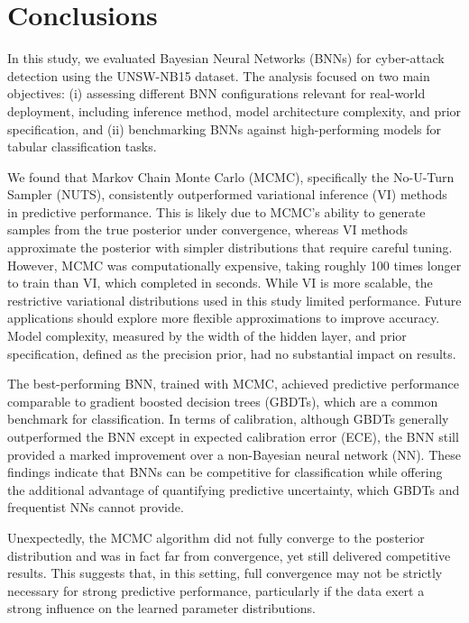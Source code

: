 \documentclass[
  a4paper,
]{scrreprt}
\begin{document}

\chapter{Conclusions}\label{conclusions}

In this study, we evaluated Bayesian Neural Networks (BNNs) for
cyber-attack detection using the UNSW-NB15 dataset. The analysis focused
on two main objectives: (i) assessing different BNN configurations
relevant for real-world deployment, including inference method, model
architecture complexity, and prior specification, and (ii) benchmarking
BNNs against high-performing models for tabular classification tasks.

We found that Markov Chain Monte Carlo (MCMC), specifically the
No-U-Turn Sampler (NUTS), consistently outperformed variational
inference (VI) methods in predictive performance. This is likely due to
MCMC's ability to generate samples from the true posterior under
convergence, whereas VI methods approximate the posterior with simpler
distributions that require careful tuning. However, MCMC was
computationally expensive, taking roughly 100 times longer to train than
VI, which completed in seconds. While VI is more scalable, the
restrictive variational distributions used in this study limited
performance. Future applications should explore more flexible
approximations to improve accuracy. Model complexity, measured by the
width of the hidden layer, and prior specification, defined as the
precision prior, had no substantial impact on results.

The best-performing BNN, trained with MCMC, achieved predictive
performance comparable to gradient boosted decision trees (GBDTs), which
are a common benchmark for classification. In terms of calibration,
although GBDTs generally outperformed the BNN except in expected
calibration error (ECE), the BNN still provided a marked improvement
over a non-Bayesian neural network (NN). These findings indicate that
BNNs can be competitive for classification while offering the additional
advantage of quantifying predictive uncertainty, which GBDTs and
frequentist NNs cannot provide.

Unexpectedly, the MCMC algorithm did not fully converge to the posterior
distribution and was in fact far from convergence, yet still delivered
competitive results. This suggests that, in this setting, full
convergence may not be strictly necessary for strong predictive
performance, particularly if the data exert a strong influence on the
learned parameter distributions.
\end{document}
